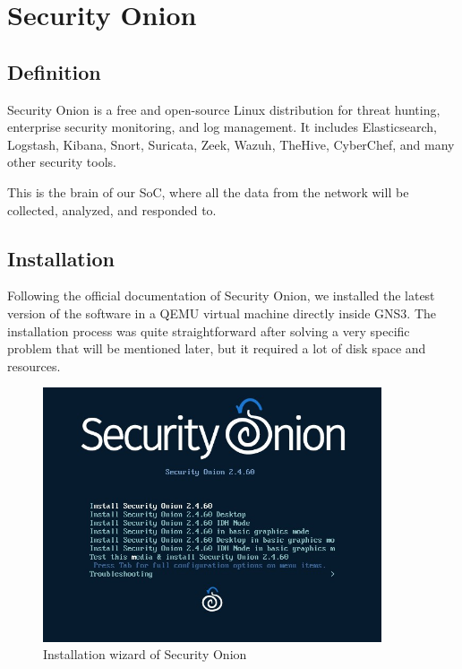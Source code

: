 \section{Security Onion}

\subsection{Definition}
Security Onion is a free and open-source Linux distribution for threat hunting, enterprise security monitoring, and log management.
It includes Elasticsearch, Logstash, Kibana, Snort, Suricata, Zeek, Wazuh, TheHive, CyberChef, and many other security tools.

This is the brain of our SoC, where all the data from the network will be collected, analyzed, and responded to.

\subsection{Installation}
Following the official documentation of Security Onion, we installed the latest version of the software in a QEMU virtual machine directly inside GNS3.
The installation process was quite straightforward after solving a very specific problem that will be mentioned later, but it required a lot of disk space and resources.

\begin{figure}[H]
    \centering
    \includegraphics[width=10cm]{src/assets/images/security-onion-install.jpg}
    \caption{Installation wizard of Security Onion}
\end{figure}

